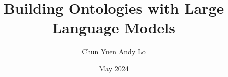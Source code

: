 \documentclass[12pt,a4paper,twoside]{report}
\title{Building Ontologies with Large Language Models}
\author{Chun Yuen Andy Lo}
\date{May 2024}
\begin{document}


\tableofcontents











\label{lastcontentpage} %





\label{lastpage}
\end{document}
